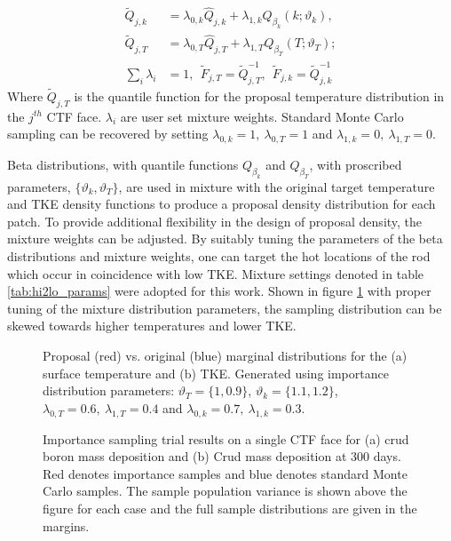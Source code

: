 \begin{align}
\tilde Q_{j,k} &= \lambda_{0,k} \hat Q_{j,k}  + \lambda_{1,k} Q_{\beta_k}(k; \vartheta_k),  \label{eq:imp_mix_k} \\
\tilde Q_{j,T} &= \lambda_{0,T} \hat Q_{j,T}  + \lambda_{1,T} Q_{\beta_T}(T; \vartheta_T);  \label{eq:imp_mix_T} \\
\sum_i \lambda_i &= 1, \ \ \tilde F_{j,T} = \tilde Q^{-1}_{j,T},\ \  \tilde F_{j,k} = \tilde Q^{-1}_{j,k}
\end{align}
Where $\tilde Q_{j,T}$ is the quantile function for the proposal temperature distribution in the $j^{th}$ CTF face. $\lambda_i$ are user set mixture weights. Standard Monte Carlo sampling can be recovered by setting $\lambda_{0,k}=1,\ \lambda_{0,T}=1$ and  $\lambda_{1,k}=0,\ \lambda_{1,T}=0$.

Beta distributions, with quantile functions $Q_{\beta_k}$ and $Q_{\beta_T}$,  with proscribed parameters, $\{ \vartheta_k, \vartheta_T \}$, are used in mixture with the original target temperature and TKE density functions to produce a proposal density distribution for each patch.  To provide additional flexibility in the design of proposal density, the mixture weights can be adjusted. By suitably tuning the parameters of the beta distributions and mixture weights, one can target the hot locations of the rod which occur in coincidence with low TKE.  Mixture settings denoted in table \ref{tab:hi2lo_params} were adopted for this work.  Shown in figure \ref{fig:imp_sample2} with proper tuning of the mixture distribution parameters, the sampling distribution can be skewed towards higher temperatures and lower TKE.

\begin{figure}[H]%
    \centering
    \qquad
    \caption[]{Proposal (red) vs. original (blue) marginal distributions for the (a) surface temperature and (b) TKE.  Generated using importance distribution parameters: $\vartheta_T = \{1, 0.9\}$,  $\vartheta_k = \{1.1, 1.2\}$,  $\lambda_{0,T}=0.6,\ \lambda_{1,T}=0.4$ and $\lambda_{0,k}=0.7,\ \lambda_{1,k}=0.3$.}%
    \label{fig:imp_sample2}%
\end{figure}


\begin{figure}[H]%
    \centering
    \qquad
    \caption[]{Importance sampling trial results on a single CTF face for (a) crud boron mass deposition and (b) Crud mass deposition at 300 days.  Red denotes importance samples and blue denotes standard Monte Carlo samples.  The sample population variance is shown above the figure for each case and the full sample distributions are given in the margins.}%
    \label{fig:imp_sample1}%
\end{figure}

